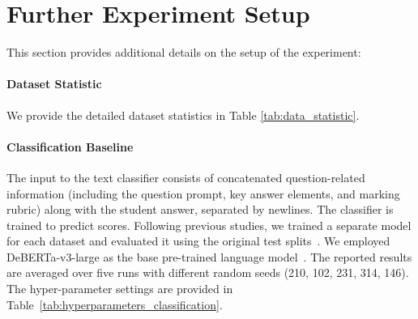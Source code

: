 \section{Further Experiment Setup} \label{sec:further_experiment_setup}

This section provides additional details on the setup of the experiment:

\paragraph{Dataset Statistic}
We provide the detailed dataset statistics in Table \ref{tab:data_statistic}.
\begin{table}[h]
\centering
{}
\caption{\small \textbf{Dataset statistics.}}
\label{tab:data_statistic}
\end{table}

\paragraph{Classification Baseline} The input to the text classifier consists of concatenated question-related information (including the question prompt, key answer elements, and marking rubric) along with the student answer, separated by newlines. The classifier is trained to predict scores. Following previous studies, we trained a separate model for each dataset and evaluated it using the original test splits~\cite{bert_classifer_aes}. We employed DeBERTa-v3-large as the base pre-trained language model~\cite{debertav3}. The reported results are averaged over five runs with different random seeds (210, 102, 231, 314, 146). The hyper-parameter settings are provided in Table~\ref{tab:hyperparameters_classification}.

